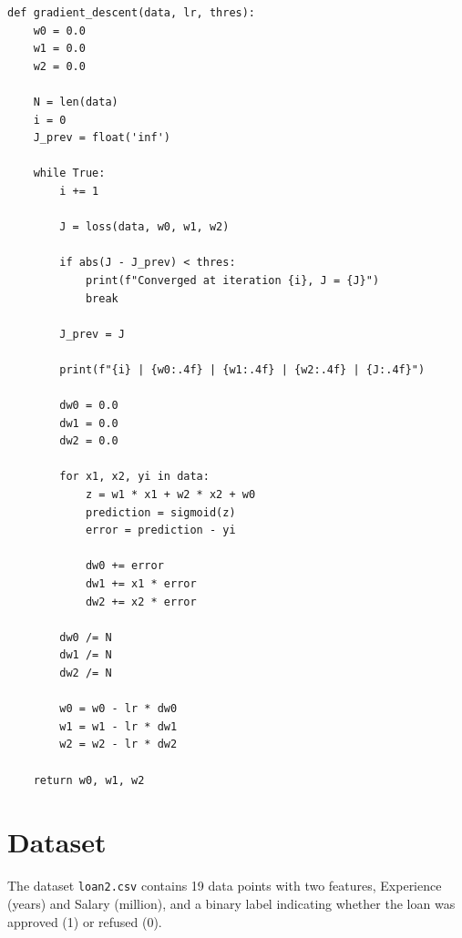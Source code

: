 \documentclass{article}
\begin{document}
\begin{verbatim}
def gradient_descent(data, lr, thres):
    w0 = 0.0
    w1 = 0.0
    w2 = 0.0

    N = len(data)
    i = 0
    J_prev = float('inf')

    while True:
        i += 1

        J = loss(data, w0, w1, w2)

        if abs(J - J_prev) < thres:
            print(f"Converged at iteration {i}, J = {J}")
            break

        J_prev = J

        print(f"{i} | {w0:.4f} | {w1:.4f} | {w2:.4f} | {J:.4f}")

        dw0 = 0.0
        dw1 = 0.0
        dw2 = 0.0

        for x1, x2, yi in data:
            z = w1 * x1 + w2 * x2 + w0
            prediction = sigmoid(z)
            error = prediction - yi

            dw0 += error
            dw1 += x1 * error
            dw2 += x2 * error

        dw0 /= N
        dw1 /= N
        dw2 /= N

        w0 = w0 - lr * dw0
        w1 = w1 - lr * dw1
        w2 = w2 - lr * dw2

    return w0, w1, w2
\end{verbatim}

\section*{Dataset}

The dataset \texttt{loan2.csv} contains 19 data points with two features,
Experience (years) and Salary (million), and a binary label indicating
whether the loan was approved (1) or refused (0).
\end{document}
